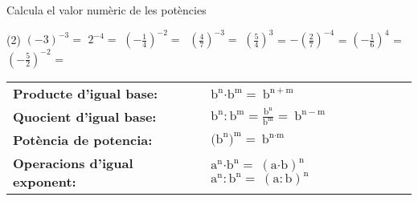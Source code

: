\begin{mylist}
\exer \spen Calcula el valor numèric de les potències
\begin{tasks}(2)
 \task ${\left(-3\right)}^{-3}=$  \task $2^{-4}=$   \task ${\left(-\frac{1}{4}\right)}^{-2}=$  \task$\ {\left(\frac{4}{7}\right)}^{-3}=$
\task $\left(\frac{5}{4}\right)^{3}$ =  \task $-\left(\frac{2}{7}\right)^{-4}$ =  
\task $\left(-\frac{1}{6}\right)^{4}$ = \task $\left(-\frac{5}{2}\right)^{-2}$ =
 \end{tasks}
\end{mylist}


\begin{theorybox}
\begin{minipage}[t]{0.82\textwidth}
	 \begin{tabular}{p{}p{}}
\textbf{Producte d'igual base:}  & ${\mathrm{b}}^{\mathrm{n}}\mathrm{\textrm{·}}{\mathrm{b}}^{\mathrm{m}}\mathrm{=\ }{\mathrm{b}}^{\mathrm{n+m}}$ \\ [0.25cm]

\textbf{Quocient d'igual base:}  & ${\mathrm{b}}^{\mathrm{n}}\mathrm{:}{\mathrm{b}}^{\mathrm{m}}\mathrm{=}\frac{{\mathrm{b}}^{\mathrm{n}}}{{\mathrm{b}}^{\mathrm{m}}}\mathrm{=\ }{\mathrm{b}}^{\mathrm{n-m}}$
\\[0.25cm]
\textbf{Potència de potencia:    } & ${{\mathrm{(b}}^{\mathrm{n}}\mathrm{)}}^{\mathrm{m}}\mathrm{=\ }{\mathrm{b}}^{\mathrm{n\textrm{·}m}}$
\\[0.25cm]
\textbf{Operacions d'igual exponent:} & ${\mathrm{a}}^{\mathrm{n}}\mathrm{\textrm{·}}{\mathrm{b}}^{\mathrm{n}}\mathrm{=\ }{\left(\mathrm{a\textrm{·}b}\right)}^{\mathrm{n}}$ \quad\quad ${\mathrm{a}}^{\mathrm{n}}\mathrm{:}{\mathrm{b}}^{\mathrm{n}}\mathrm{=\ }{\left(\mathrm{a:b}\right)}^{\mathrm{n}}$
\end{tabular}
\end{minipage}
\end{theorybox}

